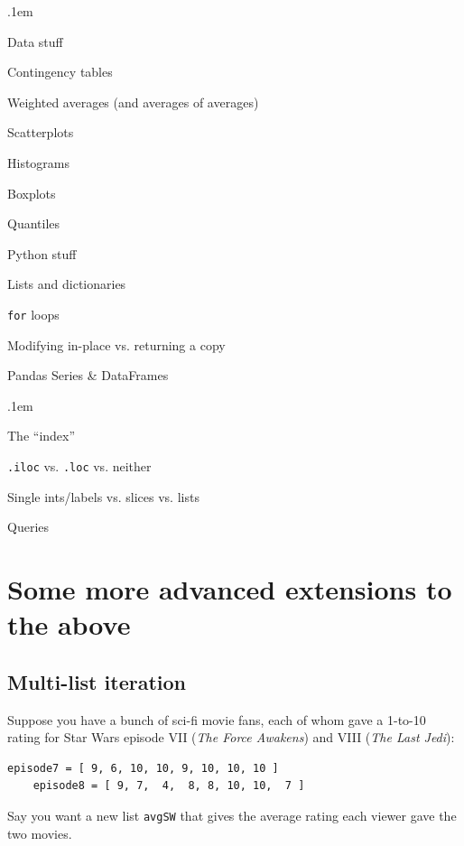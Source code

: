 \begin{compactitem}
\itemsep.1em
\item Data stuff
    \begin{compactitem}
    \item Contingency tables
    \item Weighted averages (and averages of averages)
    \item Scatterplots
    \item Histograms
    \item Boxplots
    \item Quantiles
    \end{compactitem}

\item Python stuff
    \begin{compactitem}
    \item Lists and dictionaries
    \item \texttt{for} loops
    \item Modifying in-place vs. returning a copy
    \item Pandas Series \& DataFrames
        \begin{compactitem}
        \itemsep.1em
        \item The ``index''
        \item \texttt{.iloc} vs. \texttt{.loc} vs. neither
        \item Single ints/labels vs. slices vs. lists
        \item Queries
        \end{compactitem}
    \end{compactitem}
\end{compactitem}

\section{Some more advanced extensions to the above}

\subsection{Multi-list iteration}

Suppose you have a bunch of sci-fi movie fans, each of whom gave a 1-to-10
rating for Star Wars episode VII (\textit{The Force Awakens}) and VIII
(\textit{The Last Jedi}):
\begin{Verbatim}[fontsize=\small,samepage=true,frame=single]
    episode7 = [ 9, 6, 10, 10, 9, 10, 10, 10 ]
    episode8 = [ 9, 7,  4,  8, 8, 10, 10,  7 ]
\end{Verbatim}
Say you want a new list \texttt{avgSW} that gives the average rating each
viewer gave the two movies.

